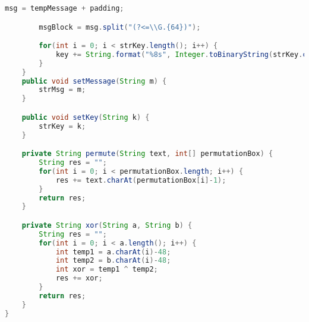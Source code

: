 \begin{lstlisting}[language=Java,basicstyle=\tiny,caption=DESEncryption.java]
        msg = tempMessage + padding;

        msgBlock = msg.split("(?<=\\G.{64})");

        for(int i = 0; i < strKey.length(); i++) {
            key += String.format("%8s", Integer.toBinaryString(strKey.charAt(i))).replace(' ', '0');
        }
    }
    public void setMessage(String m) {
        strMsg = m;
    }

    public void setKey(String k) {
        strKey = k;
    }

    private String permute(String text, int[] permutationBox) {
        String res = "";
        for(int i = 0; i < permutationBox.length; i++) {
            res += text.charAt(permutationBox[i]-1);
        }
        return res;
    }

    private String xor(String a, String b) {
        String res = "";
        for(int i = 0; i < a.length(); i++) {
            int temp1 = a.charAt(i)-48;
            int temp2 = b.charAt(i)-48;
            int xor = temp1 ^ temp2;
            res += xor;
        }
        return res;
    }
}

\end{lstlisting}


